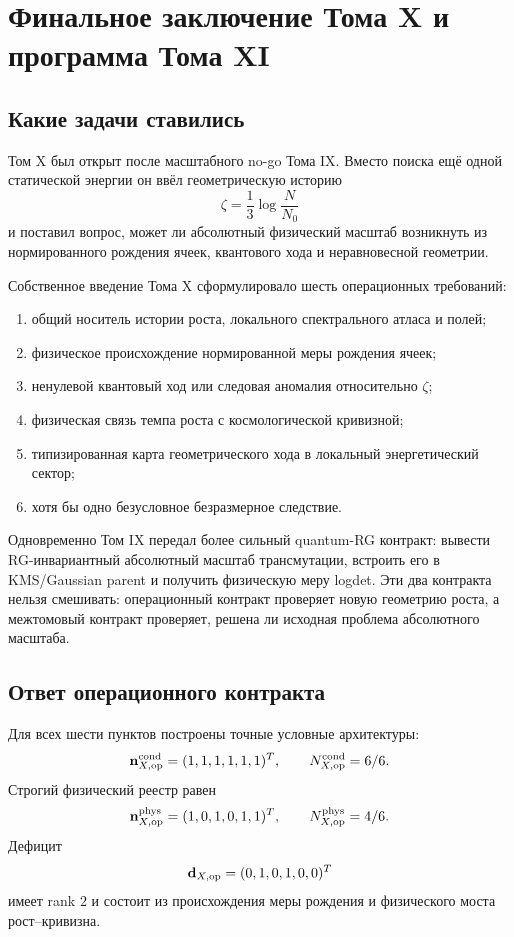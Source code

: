 \chapter{Финальное заключение Тома X и программа Тома XI}
\label{ch:v10-final-conclusion-tome11-program}

\section{Какие задачи ставились}

Том X был открыт после масштабного no-go Тома IX. Вместо поиска ещё одной
статической энергии он ввёл геометрическую историю
\begin{equation}
 \zeta=\frac13\log\frac{N}{N_0}
\end{equation}
и поставил вопрос, может ли абсолютный физический масштаб возникнуть из
нормированного рождения ячеек, квантового хода и неравновесной геометрии.

Собственное введение Тома X сформулировало шесть операционных требований:
\begin{enumerate}
\item общий носитель истории роста, локального спектрального атласа и полей;
\item физическое происхождение нормированной меры рождения ячеек;
\item ненулевой квантовый ход или следовая аномалия относительно $\zeta$;
\item физическая связь темпа роста с космологической кривизной;
\item типизированная карта геометрического хода в локальный энергетический сектор;
\item хотя бы одно безусловное безразмерное следствие.
\end{enumerate}

Одновременно Том IX передал более сильный quantum-RG контракт: вывести
RG-инвариантный абсолютный масштаб трансмутации, встроить его в KMS/Gaussian
parent и получить физическую меру logdet. Эти два контракта нельзя смешивать:
операционный контракт проверяет новую геометрию роста, а межтомовый контракт
проверяет, решена ли исходная проблема абсолютного масштаба.

\section{Ответ операционного контракта}

Для всех шести пунктов построены точные условные архитектуры:
\begin{equation}
 \mathbf n_{X,\rm op}^{\rm cond}=(1,1,1,1,1,1)^T,
 \qquad N_{X,\rm op}^{\rm cond}=6/6.
\end{equation}
Строгий физический реестр равен
\begin{equation}
 \mathbf n_{X,\rm op}^{\rm phys}=(1,0,1,0,1,1)^T,
 \qquad N_{X,\rm op}^{\rm phys}=4/6.
\end{equation}
Дефицит
\begin{equation}
 \mathbf d_{X,\rm op}=(0,1,0,1,0,0)^T
\end{equation}
имеет rank $2$ и состоит из происхождения меры рождения и физического
моста рост--кривизна.

